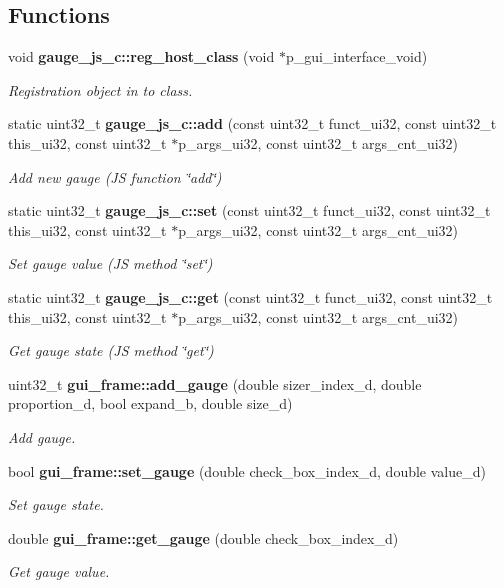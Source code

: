 \subsection*{Functions}
\begin{DoxyCompactItemize}
\item 
void \textbf{ gauge\+\_\+js\+\_\+c\+::reg\+\_\+host\+\_\+class} (void $\ast$p\+\_\+gui\+\_\+interface\+\_\+void)
\begin{DoxyCompactList}\small\item\em Registration object in to class. \end{DoxyCompactList}\item 
static uint32\+\_\+t \textbf{ gauge\+\_\+js\+\_\+c\+::add} (const uint32\+\_\+t funct\+\_\+ui32, const uint32\+\_\+t this\+\_\+ui32, const uint32\+\_\+t $\ast$p\+\_\+args\+\_\+ui32, const uint32\+\_\+t args\+\_\+cnt\+\_\+ui32)
\begin{DoxyCompactList}\small\item\em Add new gauge (JS function \char`\"{}add\char`\"{}) \end{DoxyCompactList}\item 
static uint32\+\_\+t \textbf{ gauge\+\_\+js\+\_\+c\+::set} (const uint32\+\_\+t funct\+\_\+ui32, const uint32\+\_\+t this\+\_\+ui32, const uint32\+\_\+t $\ast$p\+\_\+args\+\_\+ui32, const uint32\+\_\+t args\+\_\+cnt\+\_\+ui32)
\begin{DoxyCompactList}\small\item\em Set gauge value (JS method \char`\"{}set\char`\"{}) \end{DoxyCompactList}\item 
static uint32\+\_\+t \textbf{ gauge\+\_\+js\+\_\+c\+::get} (const uint32\+\_\+t funct\+\_\+ui32, const uint32\+\_\+t this\+\_\+ui32, const uint32\+\_\+t $\ast$p\+\_\+args\+\_\+ui32, const uint32\+\_\+t args\+\_\+cnt\+\_\+ui32)
\begin{DoxyCompactList}\small\item\em Get gauge state (JS method \char`\"{}get\char`\"{}) \end{DoxyCompactList}\item 
uint32\+\_\+t \textbf{ gui\+\_\+frame\+::add\+\_\+gauge} (double sizer\+\_\+index\+\_\+d, double proportion\+\_\+d, bool expand\+\_\+b, double size\+\_\+d)
\begin{DoxyCompactList}\small\item\em Add gauge. \end{DoxyCompactList}\item 
bool \textbf{ gui\+\_\+frame\+::set\+\_\+gauge} (double check\+\_\+box\+\_\+index\+\_\+d, double value\+\_\+d)
\begin{DoxyCompactList}\small\item\em Set gauge state. \end{DoxyCompactList}\item 
double \textbf{ gui\+\_\+frame\+::get\+\_\+gauge} (double check\+\_\+box\+\_\+index\+\_\+d)
\begin{DoxyCompactList}\small\item\em Get gauge value. \end{DoxyCompactList}\end{DoxyCompactItemize}
